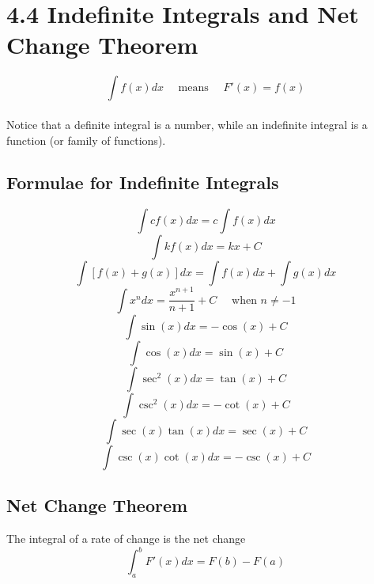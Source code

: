 %
%

\section*{4.4 Indefinite Integrals and Net Change Theorem}

$$ \int f(x)dx \quad \text{ means } \quad F'(x)=f(x) $$
\\
Notice that a definite integral is a number, while an indefinite integral is a function (or family of functions).

\subsection*{Formulae for Indefinite Integrals}

$$ \int cf(x)dx = c \int f(x)dx $$
$$ \int kf(x)dx = kx + C $$
$$ \int [f(x) +  g(x)]dx = \int f(x)dx + \int g(x)dx $$
$$ \int x^n dx = \frac{x^{n+1}}{n+1} + C \quad \text{ when } n \neq -1 $$
$$ \int \sin(x)dx = -\cos(x) + C $$
$$ \int \cos(x)dx = \sin(x) + C $$
$$ \int \sec^2(x)dx = \tan(x) + C $$
$$ \int \csc^2(x)dx = -\cot(x) + C $$
$$ \int \sec(x)\tan(x)dx = \sec(x) + C $$
$$ \int \csc(x)\cot(x)dx = -\csc(x) + C $$

\subsection*{Net Change Theorem}

The integral of a rate of change is the net change
$$ \int_a^b F'(x)dx = F(b) - F(a) $$



